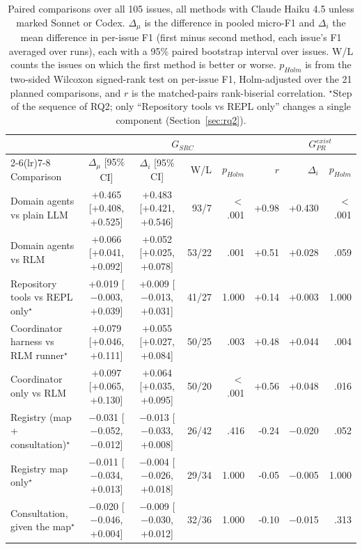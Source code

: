 \begin{table}[t]
\centering
\caption{Paired comparisons over all 105 issues, all methods with Claude Haiku 4.5 unless marked Sonnet or Codex. $\Delta_{\mu}$ is the difference in pooled micro-F1 and $\Delta_{i}$ the mean difference in per-issue F1 (first minus second method, each issue's F1 averaged over runs), each with a 95\% paired bootstrap interval over issues. W/L counts the issues on which the first method is better or worse. $p_{Holm}$ is from the two-sided Wilcoxon signed-rank test on per-issue F1, Holm-adjusted over the 21 planned comparisons, and $r$ is the matched-pairs rank-biserial correlation. $^\star$Step of the sequence of RQ2; only ``Repository tools vs REPL only'' changes a single component (Section~\ref{sec:rq2}).}
\label{tab:tests}
\scriptsize
\setlength{\tabcolsep}{3pt}
\begin{tabular}{lccrrrrr}
\toprule
& \multicolumn{5}{c}{$G_{SRC}$} & \multicolumn{2}{c}{$G_{PR}^{exist}$} \\
\cmidrule(lr){2-6}\cmidrule(lr){7-8}
Comparison & $\Delta_{\mu}$ [95\% CI] & $\Delta_{i}$ [95\% CI] & W/L & $p_{Holm}$ & $r$ & $\Delta_{i}$ & $p_{Holm}$ \\
\midrule
Domain agents vs plain LLM & +0.465 [+0.408, +0.525] & +0.483 [+0.421, +0.546] & 93/7 & $<$.001 & +0.98 & +0.430 & $<$.001 \\
Domain agents vs RLM & +0.066 [+0.041, +0.092] & +0.052 [+0.025, +0.078] & 53/22 & .001 & +0.51 & +0.028 & .059 \\
Repository tools vs REPL only$^\star$ & +0.019 [$-$0.003, +0.039] & +0.009 [$-$0.013, +0.031] & 41/27 & 1.000 & +0.14 & +0.003 & 1.000 \\
Coordinator harness vs RLM runner$^\star$ & +0.079 [+0.046, +0.111] & +0.055 [+0.027, +0.084] & 50/25 & .003 & +0.48 & +0.044 & .004 \\
Coordinator only vs RLM & +0.097 [+0.065, +0.130] & +0.064 [+0.035, +0.095] & 50/20 & $<$.001 & +0.56 & +0.048 & .016 \\
Registry (map + consultation)$^\star$ & $-$0.031 [$-$0.052, $-$0.012] & $-$0.013 [$-$0.033, +0.008] & 26/42 & .416 & -0.24 & $-$0.020 & .052 \\
Registry map only$^\star$ & $-$0.011 [$-$0.034, +0.013] & $-$0.004 [$-$0.026, +0.018] & 29/34 & 1.000 & -0.05 & $-$0.005 & 1.000 \\
Consultation, given the map$^\star$ & $-$0.020 [$-$0.046, +0.004] & $-$0.009 [$-$0.030, +0.012] & 32/36 & 1.000 & -0.10 & $-$0.015 & .313 \\

\end{tabular}
\end{table}
